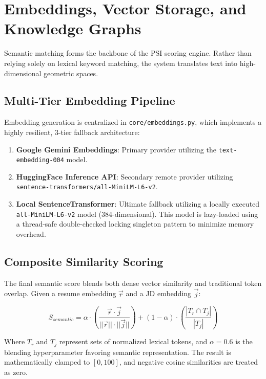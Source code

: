 \section{Embeddings, Vector Storage, and Knowledge Graphs}\label{sec:embeddings}

Semantic matching forms the backbone of the PSI scoring engine. Rather than relying solely on lexical keyword matching, the system translates text into high-dimensional geometric spaces.

\subsection{Multi-Tier Embedding Pipeline}
Embedding generation is centralized in \texttt{core/embeddings.py}, which implements a highly resilient, 3-tier fallback architecture:
\begin{enumerate}
    \item \textbf{Google Gemini Embeddings}: Primary provider utilizing the \texttt{text-embedding-004} model.
    \item \textbf{HuggingFace Inference API}: Secondary remote provider utilizing \texttt{sentence-transformers/all-MiniLM-L6-v2}.
    \item \textbf{Local SentenceTransformer}: Ultimate fallback utilizing a locally executed \texttt{all-MiniLM-L6-v2} model (384-dimensional). This model is lazy-loaded using a thread-safe double-checked locking singleton pattern to minimize memory overhead.
\end{enumerate}

\subsection{Composite Similarity Scoring}
The final semantic score blends both dense vector similarity and traditional token overlap. Given a resume embedding $\vec{r}$ and a JD embedding $\vec{j}$:

\begin{equation}
    S_{semantic} = \alpha \cdot \left( \frac{\vec{r} \cdot \vec{j}}{||\vec{r}||\cdot||\vec{j}||} \right) + (1-\alpha) \cdot \left( \frac{|T_r \cap T_j|}{|T_j|} \right)
\end{equation}

Where $T_r$ and $T_j$ represent sets of normalized lexical tokens, and $\alpha = 0.6$ is the blending hyperparameter favoring semantic representation. The result is mathematically clamped to $[0, 100]$, and negative cosine similarities are treated as zero.

